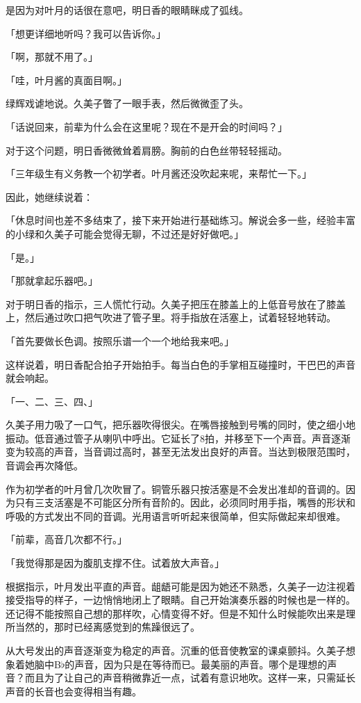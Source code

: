 \documentclass[UTF8]{ctexart}
\begin{document}
    是因为对叶月的话很在意吧，明日香的眼睛眯成了弧线。

    「想更详细地听吗？我可以告诉你。」

    「啊，那就不用了。」

    「哇，叶月酱的真面目啊。」

    绿辉戏谑地说。久美子瞥了一眼手表，然后微微歪了头。

    「话说回来，前辈为什么会在这里呢？现在不是开会的时间吗？」

    对于这个问题，明日香微微耸着肩膀。胸前的白色丝带轻轻摇动。

    「三年级生有义务教一个初学者。叶月酱还没吹起来呢，来帮忙一下。」

    因此，她继续说着：

    「休息时间也差不多结束了，接下来开始进行基础练习。解说会多一些，经验丰富的小绿和久美子可能会觉得无聊，不过还是好好做吧。」

    「是。」

    「那就拿起乐器吧。」

    对于明日香的指示，三人慌忙行动。久美子把压在膝盖上的上低音号放在了膝盖上，然后通过吹口把气吹进了管子里。将手指放在活塞上，试着轻轻地转动。

    「首先要做长色调。按照乐谱一个一个地给我来吧。」

    这样说着，明日香配合拍子开始拍手。每当白色的手掌相互碰撞时，干巴巴的声音就会响起。

    「一、二、三、四、」

    久美子用力吸了一口气，把乐器吹得很尖。在嘴唇接触到号嘴的同时，使之细小地振动。低音通过管子从喇叭中呼出。它延长了8拍，并移至下一个声音。声音逐渐变为较高的声音，当音调过高时，甚至无法发出良好的声音。当达到极限范围时，音调会再次降低。

    作为初学者的叶月曾几次吹冒了。铜管乐器只按活塞是不会发出准却的音调的。因为只有三支活塞是不可能区分所有音阶的。因此，必须同时用手指，嘴唇的形状和呼吸的方式发出不同的音调。光用语言听听起来很简单，但实际做起来却很难。

    「前辈，高音几次都不行。」

    「我觉得那是因为腹肌支撑不住。试着放大声音。」

    根据指示，叶月发出平直的声音。龃龉可能是因为她还不熟悉，久美子一边注视着接受指导的样子，一边悄悄地闭上了眼睛。自己开始演奏乐器的时候也是一样的。还记得不能按照自己想的那样吹，心情变得不好。但是不知什么时候能吹出来是理所当然的，那时已经离感觉到的焦躁很远了。

    从大号发出的声音逐渐变为稳定的声音。沉重的低音使教室的课桌颤抖。久美子想象着她脑中B$\flat$的声音，因为只是在等待而已。最美丽的声音。哪个是理想的声音？而且为了让自己的声音稍微靠近一点，试着有意识地吹。这样一来，只需延长声音的长音也会变得相当有趣。
\end{document}
